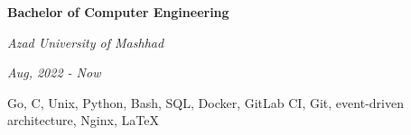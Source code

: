 \documentclass{engineercv}
\begin{document}
\begin{minipage}{\textwidth}
  \begin{multicols}{2}
    \begin{minipage}{0.5\textwidth}
      \textbf{Bachelor of Computer Engineering}

      \textit{Azad University of Mashhad}

      \textit{Aug, 2022 - Now}
    \end{minipage}
    \columnbreak
    \begin{minipage}{0.5\textwidth}
      Go, C, Unix, Python, Bash, SQL, Docker, GitLab CI, Git, event-driven architecture,
      Nginx, \LaTeX
    \end{minipage}
  \end{multicols}
\end{minipage}
\end{document}
